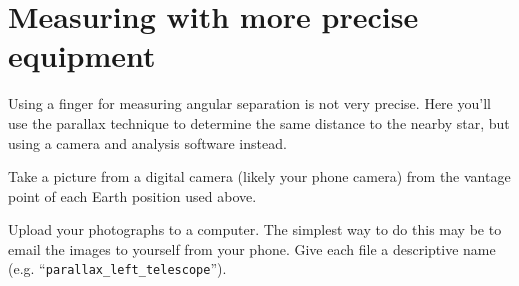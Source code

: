 \section{Measuring with more precise equipment}

Using a finger for measuring angular separation is not very precise. Here you'll use the parallax technique to determine the same distance to the nearby star, but using a camera and analysis software instead.

\begin{steps}
	\item Take a picture from a digital camera (likely your phone camera) from the vantage point of each Earth position used above.
	
	


	\item Upload your photographs to a computer. The simplest way to do this may be to email the images to yourself from your phone. Give each file a descriptive name (e.g. ``\texttt{parallax\_left\_telescope}'').
\end{steps}

